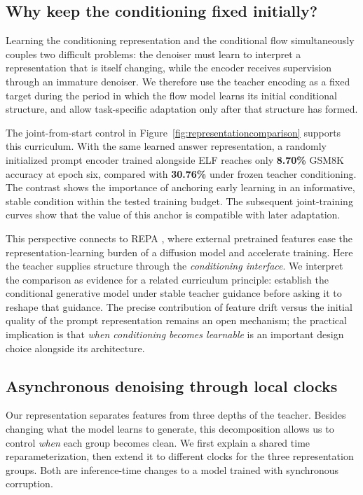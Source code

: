 \subsection{Why keep the conditioning fixed initially?}
\label{sec:conditioningcurriculum}

Learning the conditioning representation and the conditional flow simultaneously couples two difficult problems: the denoiser must learn to interpret a representation that is itself changing, while the encoder receives supervision through an immature denoiser. We therefore use the teacher encoding as a fixed target during the period in which the flow model learns its initial conditional structure, and allow task-specific adaptation only after that structure has formed.

The joint-from-start control in Figure~\ref{fig:representationcomparison} supports this curriculum. With the same learned answer representation, a randomly initialized prompt encoder trained alongside ELF reaches only \textbf{8.70\%} GSM8K accuracy at epoch six, compared with \textbf{30.76\%} under frozen teacher conditioning. The contrast shows the importance of anchoring early learning in an informative, stable condition within the tested training budget. The subsequent joint-training curves show that the value of this anchor is compatible with later adaptation.

This perspective connects to REPA \citep{repa}, where external pretrained features ease the representation-learning burden of a diffusion model and accelerate training. Here the teacher supplies structure through the \emph{conditioning interface}. We interpret the comparison as evidence for a related curriculum principle: establish the conditional generative model under stable teacher guidance before asking it to reshape that guidance. The precise contribution of feature drift versus the initial quality of the prompt representation remains an open mechanism; the practical implication is that \emph{when conditioning becomes learnable} is an important design choice alongside its architecture.

\subsection{Asynchronous denoising through local clocks}
\label{sec:clocks}

Our representation separates features from three depths of the teacher. Besides changing what the model learns to generate, this decomposition allows us to control \emph{when} each group becomes clean. We first explain a shared time reparameterization, then extend it to different clocks for the three representation groups. Both are inference-time changes to a model trained with synchronous corruption.

